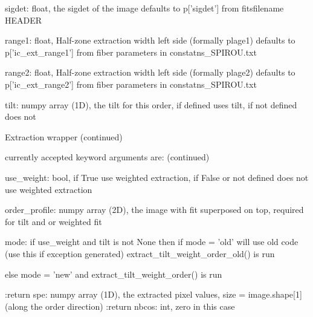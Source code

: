 \begin{minipage}{\textwidth}
\begin{pythondocstring}
    sigdet:         float, the sigdet of the image
                    defaults to p['sigdet'] from fitsfilename HEADER

    range1:         float, Half-zone extraction width left side
                    (formally plage1)
                    defaults to p['ic_ext_range1'] from fiber parameters in
                    constatns_SPIROU.txt

    range2:         float, Half-zone extraction width left side
                    (formally plage2)
                    defaults to p['ic_ext_range2'] from fiber parameters in
                    constatns_SPIROU.txt

    tilt:           numpy array (1D), the tilt for this order, if defined
                    uses tilt, if not defined does not
\end{pythondocstring}
\end{minipage}

\noindent\begin{minipage}{\textwidth}
\begin{pythondocstring}
Extraction wrapper (continued)

currently accepted keyword arguments are: (continued)

    use_weight:    bool, if True use weighted extraction, if False or not
                    defined does not use weighted extraction

    order_profile:  numpy array (2D), the image with fit superposed on top,
                    required for tilt and or weighted fit

    mode:           if use_weight and tilt is not None then
                    if mode = 'old'  will use old code (use this if
                    exception generated)
                    extract_tilt_weight_order_old() is run

                    else mode = 'new' and
                    extract_tilt_weight_order() is run

:return spe: numpy array (1D), the extracted pixel values,
             size = image.shape[1] (along the order direction)
:return nbcos: int, zero in this case
\end{pythondocstring}
\end{minipage}

